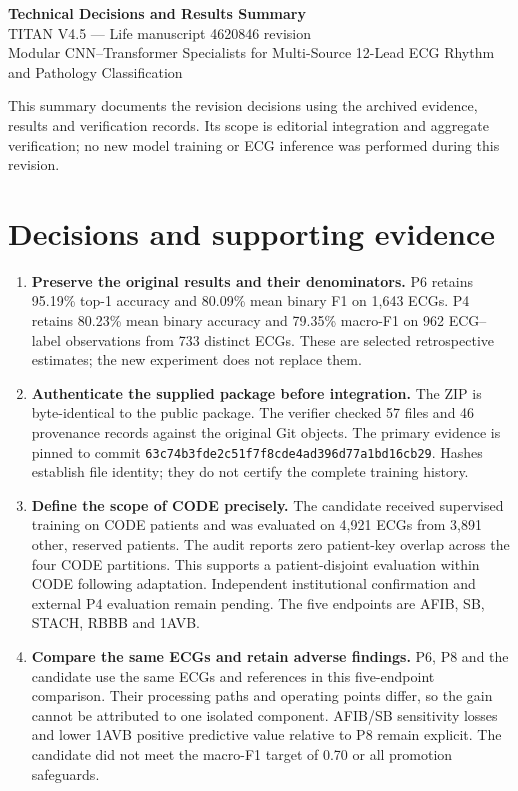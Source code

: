 \documentclass[11pt,a4paper]{article}
\begin{document}
\begin{center}
{\Large\bfseries Technical Decisions and Results Summary}\\[4pt]
TITAN V4.5 --- Life manuscript 4620846 revision\\[2pt]
{\small Modular CNN--Transformer Specialists for Multi-Source 12-Lead ECG Rhythm and Pathology Classification}
\end{center}

This summary documents the revision decisions using the archived evidence, results and verification records. Its scope is editorial integration and aggregate verification; no new model training or ECG inference was performed during this revision.

\section*{Decisions and supporting evidence}
\begin{enumerate}
\item \textbf{Preserve the original results and their denominators.}
P6 retains 95.19\% top-1 accuracy and 80.09\% mean binary F1 on 1,643 ECGs. P4 retains 80.23\% mean binary accuracy and 79.35\% macro-F1 on 962 ECG--label observations from 733 distinct ECGs. These are selected retrospective estimates; the new experiment does not replace them.

\item \textbf{Authenticate the supplied package before integration.}
The ZIP is byte-identical to the public package. The verifier checked 57 files and 46 provenance records against the original Git objects. The primary evidence is pinned to commit \texttt{63c74b3fde2c51f7f8cd}\allowbreak\texttt{e4ad396d77a1bd16cb29}. Hashes establish file identity; they do not certify the complete training history.

\item \textbf{Define the scope of CODE precisely.}
The candidate received supervised training on CODE patients and was evaluated on 4,921 ECGs from 3,891 other, reserved patients. The audit reports zero patient-key overlap across the four CODE partitions. This supports a patient-disjoint evaluation within CODE following adaptation. Independent institutional confirmation and external P4 evaluation remain pending. The five endpoints are AFIB, SB, STACH, RBBB and 1AVB.

\item \textbf{Compare the same ECGs and retain adverse findings.}
P6, P8 and the candidate use the same ECGs and references in this five-endpoint comparison. Their processing paths and operating points differ, so the gain cannot be attributed to one isolated component. AFIB/SB sensitivity losses and lower 1AVB positive predictive value relative to P8 remain explicit. The candidate did not meet the macro-F1 target of 0.70 or all promotion safeguards.
\end{enumerate}
\end{document}
